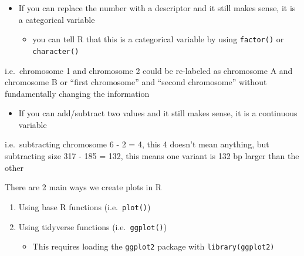 \documentclass[
  letterpaper,
  DIV=11,
  numbers=noendperiod]{scrreprt}
\providecommand{\tightlist}{%
  \setlength{\itemsep}{0pt}\setlength{\parskip}{0pt}}\usepackage{longtable,booktabs,array}
\begin{document}
\begin{tcolorbox}[enhanced jigsaw, left=2mm, colframe=quarto-callout-tip-color-frame, leftrule=.75mm, opacitybacktitle=0.6, toptitle=1mm, title=\textcolor{quarto-callout-tip-color}{\faLightbulb}\hspace{0.5em}{Differentiating between continuous variables and categorical variables
that are represented by a number}, opacityback=0, coltitle=black, colbacktitle=quarto-callout-tip-color!10!white, breakable, colback=white, titlerule=0mm, bottomrule=.15mm, arc=.35mm, bottomtitle=1mm, rightrule=.15mm, toprule=.15mm]

\begin{itemize}
\tightlist
\item
  If you can replace the number with a descriptor and it still makes
  sense, it is a categorical variable

  \begin{itemize}
  \tightlist
  \item
    you can tell R that this is a categorical variable by using
    \texttt{factor()} or \texttt{character()}
  \end{itemize}
\end{itemize}

i.e.~chromosome 1 and chromosome 2 could be re-labeled as chromosome A
and chromosome B or ``first chromosome'' and ``second chromosome''
without fundamentally changing the information

\begin{itemize}
\tightlist
\item
  If you can add/subtract two values and it still makes sense, it is a
  continuous variable
\end{itemize}

i.e.~subtracting chromosome 6 - 2 = 4, this 4 doesn't mean anything, but
subtracting size 317 - 185 = 132, this means one variant is 132 bp
larger than the other

\end{tcolorbox}

There are 2 main ways we create plots in R

\begin{enumerate}
\def\labelenumi{\arabic{enumi}.}
\item
  Using base R functions (i.e.~\texttt{plot()})
\item
  Using tidyverse functions (i.e.~\texttt{ggplot()})

  \begin{itemize}
  \tightlist
  \item
    This requires loading the \texttt{ggplot2} package with
    \texttt{library(ggplot2)}
  \end{itemize}
\end{enumerate}
\end{document}
